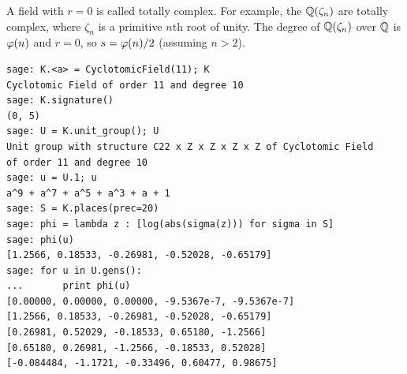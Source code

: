 
A field with $r=0$ is called totally complex.  For
example, the  $\mathbb{Q}(\zeta_n)$ are totally
complex, where $\zeta_n$ is a primitive $n$th root of 
unity.  The degree of $\mathbb{Q}(\zeta_n)$ over $\mathbb{Q}$ is
$\varphi(n)$ and $r=0$, so $s=\varphi(n)/2$ (assuming $n>2$).
\begin{lstlisting}
sage: K.<a> = CyclotomicField(11); K
Cyclotomic Field of order 11 and degree 10
sage: K.signature()
(0, 5)
sage: U = K.unit_group(); U
Unit group with structure C22 x Z x Z x Z x Z of Cyclotomic Field 
of order 11 and degree 10
sage: u = U.1; u
a^9 + a^7 + a^5 + a^3 + a + 1
sage: S = K.places(prec=20)
sage: phi = lambda z : [log(abs(sigma(z))) for sigma in S]
sage: phi(u)
[1.2566, 0.18533, -0.26981, -0.52028, -0.65179]
sage: for u in U.gens():
...       print phi(u)
[0.00000, 0.00000, 0.00000, -9.5367e-7, -9.5367e-7]
[1.2566, 0.18533, -0.26981, -0.52028, -0.65179]
[0.26981, 0.52029, -0.18533, 0.65180, -1.2566]
[0.65180, 0.26981, -1.2566, -0.18533, 0.52028]
[-0.084484, -1.1721, -0.33496, 0.60477, 0.98675]
\end{lstlisting}


